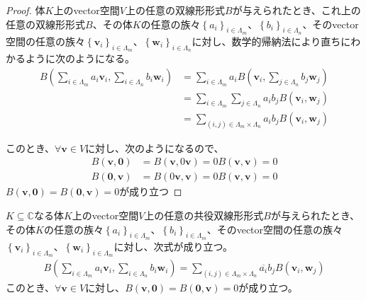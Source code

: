 \documentclass[dvipdfmx]{jsarticle}
\begin{document}
\begin{proof}
体$K$上のvector空間$V$上の任意の双線形形式$B$が与えられたとき、これ上の任意の双線形形式$B$、その体$K$の任意の族々$\left\{ a_{i} \right\}_{i \in \varLambda_{m}}$、$\left\{ b_{i} \right\}_{i \in \varLambda_{n}}$、そのvector空間の任意の族々$\left\{ \mathbf{v}_{i} \right\}_{i \in \varLambda_{m}}$、$\left\{ \mathbf{w}_{i} \right\}_{i \in \varLambda_{n}}$に対し、数学的帰納法により直ちにわかるように次のようになる。
\begin{align*}
B\left( \sum_{i \in \varLambda_{m}} {a_{i}\mathbf{v}_{i}},\sum_{i \in \varLambda_{n}} {b_{i}\mathbf{w}_{i}} \right) &= \sum_{i \in \varLambda_{m}} {a_{i}B\left( \mathbf{v}_{i},\sum_{j \in \varLambda_{n}} {b_{j}\mathbf{w}_{j}} \right)}\\
&= \sum_{i \in \varLambda_{m}} {\sum_{j \in \varLambda_{n}} {a_{i}b_{j}B\left( \mathbf{v}_{i},\mathbf{w}_{j} \right)}}\\
&= \sum_{(i,j) \in \varLambda_{m} \times \varLambda_{n}} {a_{i}b_{j}B\left( \mathbf{v}_{i},\mathbf{w}_{j} \right)}
\end{align*}\par
このとき、$\forall\mathbf{v} \in V$に対し、次のようになるので、
\begin{align*}
B\left( \mathbf{v},\mathbf{0} \right) &= B\left( \mathbf{v},0\mathbf{v} \right) = 0B\left( \mathbf{v},\mathbf{v} \right) = 0\\
B\left( \mathbf{0},\mathbf{v} \right) &= B\left( 0\mathbf{v},\mathbf{v} \right) = 0B\left( \mathbf{v},\mathbf{v} \right) = 0
\end{align*}
$B\left( \mathbf{v},\mathbf{0} \right) = B\left( \mathbf{0},\mathbf{v} \right) = 0$が成り立つ
\end{proof}
\begin{thm}\label{2.3.4.2}
$K \subseteq \mathbb{C}$なる体$K$上のvector空間$V$上の任意の共役双線形形式$B$が与えられたとき、その体$K$の任意の族々$\left\{ a_{i} \right\}_{i \in \varLambda_{m}}$、$\left\{ b_{i} \right\}_{i \in \varLambda_{m}}$、そのvector空間の任意の族々$\left\{ \mathbf{v}_{i} \right\}_{i \in \varLambda_{m}}$、$\left\{ \mathbf{w}_{i} \right\}_{i \in \varLambda_{m}}$に対し、次式が成り立つ。
\begin{align*}
B\left( \sum_{i \in \varLambda_{m}} {a_{i}\mathbf{v}_{i}},\sum_{i \in \varLambda_{n}} {b_{i}\mathbf{w}_{i}} \right) = \sum_{(i,j) \in \varLambda_{m} \times \varLambda_{n}} {\overline{a_{i}}b_{j}B\left( \mathbf{v}_{i},\mathbf{w}_{j} \right)}
\end{align*}
このとき、$\forall\mathbf{v} \in V$に対し、$B\left( \mathbf{v},\mathbf{0} \right) = B\left( \mathbf{0},\mathbf{v} \right) = 0$が成り立つ。
\end{thm}
\end{document}

